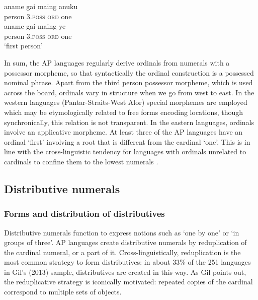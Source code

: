 \ea
\gll aname    gai  maing   anuku\\  
     person    3\textsc{.poss}   \textsc{ord} one\\ 
\ex
\gll aname    gai  maing   ye\\
    person    3\textsc{.poss}   \textsc{ord} one\\
\glt `first person'
\z\z
 

      

In sum, the AP languages regularly derive ordinals from numerals with a possessor morpheme, so that syntactically the ordinal construction is a possessed nominal phrase. Apart from the third person possessor morpheme, which is used across the board, ordinals vary in structure when we go from west to east. In the western languages (Pantar-Straits-West Alor) special morphemes are employed which may be etymologically related to free forms encoding locations, though synchronically, this relation is not transparent. In the eastern languages, ordinals involve an applicative morpheme. At least three of the AP languages have an ordinal `first' involving a root that is different from the cardinal `one'. This is in line with the cross-linguistic tendency for languages with ordinals unrelated to cardinals to confine them to the lowest numerals \citep{StolzEtAl2013}.

\subsection{Distributive numerals}
\label{sec:8:Distributive}
\subsubsection{Forms and distribution of distributives}
Distributive numerals function to express notions such as `one by one' or `in groups of three'. AP languages create distributive numerals by reduplication of the cardinal numeral, or a part of it. Cross-linguistically, reduplication is the most common strategy to form distributives: in about 33\% of the 251 languages in Gil's (2013) \nocite{Gil2013} sample, distributives are created in this way. As Gil points out, the reduplicative strategy is iconically motivated: repeated copies of the cardinal correspond to multiple sets of objects.

